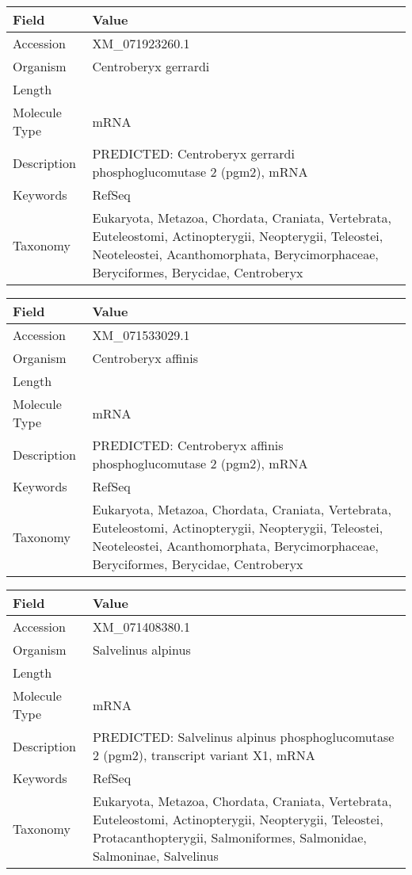 \documentclass[10pt]{article}
\begin{document}
{\footnotesize
\begin{longtable}{>{\raggedright\arraybackslash}p{4.5cm} >{\raggedright\arraybackslash}p{11.5cm}}
\textbf{Field} & \textbf{Value} \\
\hline
Accession & XM\_071923260.1 \\
Organism & Centroberyx gerrardi \\
Length & 3010 \\
Molecule Type & mRNA \\
Description & PREDICTED: Centroberyx gerrardi phosphoglucomutase 2 (pgm2), mRNA \\
Keywords & RefSeq \\
Taxonomy & Eukaryota, Metazoa, Chordata, Craniata, Vertebrata, Euteleostomi, Actinopterygii, Neopterygii, Teleostei, Neoteleostei, Acanthomorphata, Berycimorphaceae, Beryciformes, Berycidae, Centroberyx \\
\end{longtable}
}

{\footnotesize
\begin{longtable}{>{\raggedright\arraybackslash}p{4.5cm} >{\raggedright\arraybackslash}p{11.5cm}}
\textbf{Field} & \textbf{Value} \\
\hline
Accession & XM\_071533029.1 \\
Organism & Centroberyx affinis \\
Length & 3021 \\
Molecule Type & mRNA \\
Description & PREDICTED: Centroberyx affinis phosphoglucomutase 2 (pgm2), mRNA \\
Keywords & RefSeq \\
Taxonomy & Eukaryota, Metazoa, Chordata, Craniata, Vertebrata, Euteleostomi, Actinopterygii, Neopterygii, Teleostei, Neoteleostei, Acanthomorphata, Berycimorphaceae, Beryciformes, Berycidae, Centroberyx \\
\end{longtable}
}

{\footnotesize
\begin{longtable}{>{\raggedright\arraybackslash}p{4.5cm} >{\raggedright\arraybackslash}p{11.5cm}}
\textbf{Field} & \textbf{Value} \\
\hline
Accession & XM\_071408380.1 \\
Organism & Salvelinus alpinus \\
Length & 4580 \\
Molecule Type & mRNA \\
Description & PREDICTED: Salvelinus alpinus phosphoglucomutase 2 (pgm2), transcript variant X1, mRNA \\
Keywords & RefSeq \\
Taxonomy & Eukaryota, Metazoa, Chordata, Craniata, Vertebrata, Euteleostomi, Actinopterygii, Neopterygii, Teleostei, Protacanthopterygii, Salmoniformes, Salmonidae, Salmoninae, Salvelinus \\
\end{longtable}
}
\end{document}
